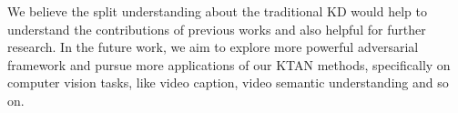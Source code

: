 \documentclass[letterpaper]{article} %
\begin{document}
We believe the split understanding about the traditional KD would help to understand the contributions of previous works and also helpful for further research. In the future work, we aim to explore more powerful adversarial framework and pursue more applications of our KTAN methods, specifically on computer vision tasks, like video caption, video semantic understanding and so on.




\end{document}
